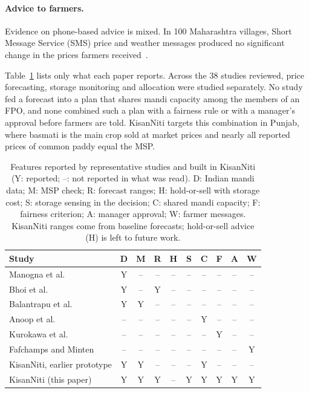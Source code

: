 \paragraph{Advice to farmers.} Evidence on phone-based advice is mixed. In 100 Maharashtra villages, Short Message Service (SMS) price
and weather messages produced no significant change in the prices farmers received~\cite{fafchamps2012}.

Table~\ref{tab:related} lists only what each paper reports. Across the 38 studies reviewed, price forecasting, storage monitoring and
allocation were studied separately. No study fed a forecast into a plan that shares mandi capacity among the members of an FPO, and none
combined such a plan with a fairness rule or with a manager's approval before farmers are told. KisanNiti targets this combination in
Punjab, where basmati is the main crop sold at market prices and nearly all reported prices of common paddy equal the MSP.

\begin{table}[t]
\centering
\caption{Features reported by representative studies and built in KisanNiti (Y: reported; --: not reported in what was read). D: Indian mandi data; M: MSP check; R: forecast ranges; H: hold-or-sell with storage cost; S: storage sensing in the decision; C: shared mandi capacity; F: fairness criterion; A: manager approval; W: farmer messages. KisanNiti ranges come from baseline forecasts; hold-or-sell advice (H) is left to future work.}
\label{tab:related}
\scriptsize
\setlength{\tabcolsep}{3pt}
\renewcommand{\arraystretch}{0.9}
\begin{tabular}{lccccccccc}
\toprule
Study & D & M & R & H & S & C & F & A & W\\
\midrule
Manogna et al.~\cite{manogna} & Y & -- & -- & -- & -- & -- & -- & -- & --\\
Bhoi et al.~\cite{bhoi2023} & Y & -- & Y & -- & -- & -- & -- & -- & --\\
Balantrapu et al.~\cite{balantrapu2026} & Y & Y & -- & -- & -- & -- & -- & -- & --\\
Anoop et al.~\cite{anoop} & -- & -- & -- & -- & -- & Y & -- & -- & --\\
Kurokawa et al.~\cite{kurokawa2018} & -- & -- & -- & -- & -- & -- & Y & -- & --\\
Fafchamps and Minten~\cite{fafchamps2012} & -- & -- & -- & -- & -- & -- & -- & -- & Y\\
\midrule
KisanNiti, earlier prototype & Y & Y & -- & -- & -- & Y & -- & -- & --\\
KisanNiti (this paper) & Y & Y & Y & -- & Y & Y & Y & Y & Y\\
\bottomrule
\end{tabular}
\end{table}
